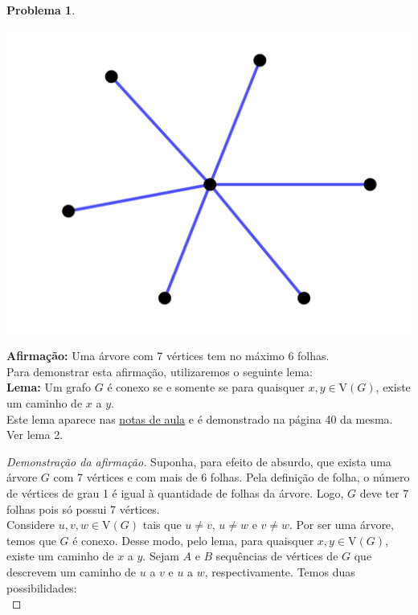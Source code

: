 \documentclass[12pt, a4paper]{article}
\theoremstyle{definition} \newtheorem{prob}{Problema}
\begin{document}
\begin{prob}
\begin{center}
\includegraphics[scale=0.25]{arvore_6folhas.png}
\end{center}

\textbf{Afirmação:} Uma árvore com 7 vértices tem no máximo 6 folhas. \\


Para demonstrar esta afirmação, utilizaremos o seguinte lema: \\

\textbf{Lema:} Um grafo \(G\) é conexo se e somente se para quaisquer \(x,y \in \mathrm{V}(G)\), existe um caminho de \(x\) a \(y\). \\

Este lema aparece nas \href{https://drive.google.com/file/d/16Gy9vck48p64A-3u1t2-uUVGOVqOlAOg/view}{notas de aula} e é demonstrado na página 40 da mesma. Ver lema 2.

\begin{proof}[Demonstração da afirmação]
Suponha, para efeito de absurdo, que exista uma árvore \(G\) com 7 vértices e com mais de 6 folhas. Pela definição de folha, o número de vértices de grau 1 é igual à quantidade de folhas da árvore. Logo, \(G\) deve ter 7 folhas pois só possui 7 vértices. \\

Considere \(u,v,w \in \mathrm{V}(G)\) tais que \(u\neq v\), \(u \neq w\) e \(v \neq w\). Por ser uma árvore, temos que \(G\) é conexo. Desse modo, pelo lema, para quaisquer \(x,y \in \mathrm{V}(G)\), existe um caminho de \(x\) a \(y\).  Sejam \(A\) e \(B\) sequências de vértices de \(G\) que descrevem um caminho de \(u\) a \(v\) e \(u\) a \(w\), respectivamente. Temos duas possibilidades: \\


\end{proof}
\end{prob}
\end{document}
